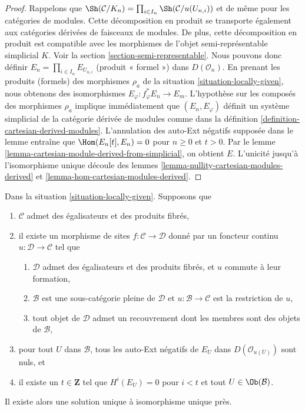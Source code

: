 \begin{proof}
Rappelons que
$\Sh(\mathcal{C}/K_n) = \prod_{i \in I_n} \Sh(\mathcal{C}/u(U_{n, i}))$
et de même pour les catégories de modules. Cette décomposition en produit
se transporte également aux catégories dérivées de faisceaux de modules.
De plus, cette décomposition en produit est compatible avec
les morphismes de l'objet semi-représentable simplicial $K$.
Voir la section \ref{section-semi-representable}.
Nous pouvons donc définir $E_n = \prod_{i \in I_n} E_{U_{n, i}}$
(produit « formel ») dans $D(\mathcal{O}_n)$.
En prenant les produits (formels) des morphismes $\rho_a$ de
la situation \ref{situation-locally-given},
nous obtenons des isomorphismes $E_\varphi : f_\varphi^*E_n \to E_m$.
L'hypothèse sur les composés des morphismes $\rho_a$
implique immédiatement que $(E_n, E_\varphi)$
définit un système simplicial de la catégorie dérivée de modules
comme dans la définition \ref{definition-cartesian-derived-modules}.
L'annulation des auto-Ext négatifs supposée dans le lemme entraîne que
$\Hom(E_n[t], E_n) = 0$ pour $n \geq 0$ et $t > 0$.
Par le
lemme \ref{lemma-cartesian-module-derived-from-simplicial},
on obtient $E$.
L'unicité jusqu'à l'isomorphisme unique découle des lemmes
\ref{lemma-nullity-cartesian-modules-derived} et
\ref{lemma-hom-cartesian-modules-derived}.
\end{proof}

\begin{lemma}
\label{lemma-bbd-glueing}
Dans la situation \ref{situation-locally-given}. Supposons que
\begin{enumerate}
\item $\mathcal{C}$ admet des égalisateurs et des produits fibrés,
\item il existe un morphisme de sites $f : \mathcal{C} \to \mathcal{D}$
donné par un foncteur continu $u : \mathcal{D} \to \mathcal{C}$
tel que
\begin{enumerate}
\item $\mathcal{D}$ admet des égalisateurs et des produits fibrés, et $u$
commute à leur formation,
\item $\mathcal{B}$ est une sous-catégorie pleine de $\mathcal{D}$
et $u : \mathcal{B} \to \mathcal{C}$ est la restriction de $u$,
\item tout objet de $\mathcal{D}$ admet un recouvrement dont les membres
sont des objets de $\mathcal{B}$,
\end{enumerate}
\item pour tout $U$ dans $\mathcal{B}$, tous les auto-Ext négatifs de $E_U$
dans $D(\mathcal{O}_{u(U)})$ sont nuls, et
\item il existe un $t \in \mathbf{Z}$ tel que $H^i(E_U) = 0$ pour $i < t$
et tout $U \in \Ob(\mathcal{B})$.
\end{enumerate}
Il existe alors une solution unique à isomorphisme unique près.
\end{lemma}

